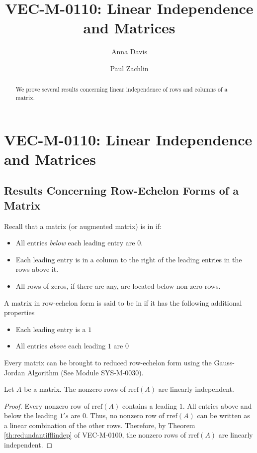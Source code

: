 \documentclass{ximera}
\author{Anna Davis \and Paul Zachlin} \title{VEC-M-0110: Linear Independence and Matrices} \license{CC-BY 4.0}
\begin{document}
\begin{abstract}
We prove several results concerning linear independence of rows and columns of a matrix.
\end{abstract}
\maketitle


\section*{VEC-M-0110: Linear Independence and Matrices}
\subsection{Results Concerning Row-Echelon Forms of a Matrix}

Recall that a matrix (or augmented matrix) is in  if:
\begin{itemize}
\item All entries {\it below} each leading entry are $0$.
\item Each leading entry is in a column to the right of the leading entries in the rows above it.
\item All rows of zeros, if there are any, are located below non-zero rows.
\end{itemize}

A matrix in row-echelon form is said to be in  if it has the following additional properties
\begin{itemize}
\item Each leading entry is a $1$
\item All entries {\it above} each leading $1$ are $0$
\end{itemize}

Every matrix can be brought to reduced row-echelon form using the Gauss-Jordan Algorithm (See Module SYS-M-0030).

\begin{theorem}\label{th:rowsrreflinind}
Let $A$ be a matrix.  The nonzero rows of $\mbox{rref}(A)$ are linearly independent.
\end{theorem}
\begin{proof}
Every nonzero row of $\mbox{rref}(A)$ contains a leading $1$.  All entries above and below the leading $1's$ are $0$.  Thus, no nonzero row of $\mbox{rref}(A)$ can be written as a linear combination of the other rows.  Therefore, by Theorem \ref{th:redundantifflindep} of VEC-M-0100, the nonzero rows of $\mbox{rref}(A)$ are linearly independent.
\end{proof}
\end{document}
